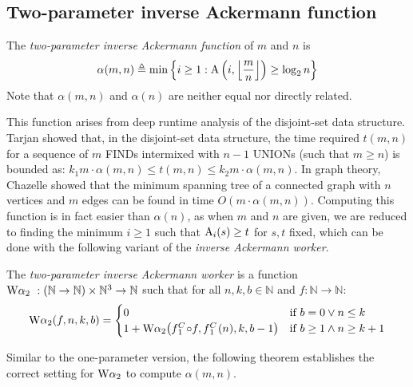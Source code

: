 \newcommand{\Texp}{\runtime_{\li{exp}}}
\newcommand{\Tmul}{\runtime_{\li{mul}}}
\newcommand{\Tleb}{\runtime_{\li{leb}}}
\newcommand{\Tsucc}{\runtime_{\li{succ}}}
\subsection{Two-parameter inverse Ackermann function}
\begin{defn} \label{defn: 2para-alpha}
	The \emph{two-parameter inverse Ackermann function} of $m$ and $n$ is
	\begin{equation} \label{eq: tmp-2para-alpha}
	\alpha(m, n) \triangleq \min\left\{i \ge 1 : \text{A}\left(i, \left\lfloor \frac{m}{n} \right\rfloor \right)\ge \log_2n \right\}
	\end{equation}
	Note that $\alpha(m, n)$ and $\alpha(n)$ are neither equal nor directly related.
\end{defn}
This function arises from deep runtime analysis of the disjoint-set data structure. Tarjan \cite{tarjan} showed that, in the disjoint-set data structure, the time required $t(m,n)$ for a sequence of $m$ \textsc{\color{magenta}FIND}s intermixed with $n-1$ \textsc{\color{magenta}UNION}s (such that $m \geq n$) is bounded as: $k_{1}m\cdot\alpha(m,n) \leq t(m,n) \leq k_{2}m\cdot\alpha(m,n)$. In graph theory, Chazelle \cite{chazelle} showed that the minimum spanning tree of a connected graph with $n$ vertices and $m$ edges can be found in time $O(m\cdot\alpha(m,n))$. Computing this function is in fact easier than $\alpha(n)$, as when $m$ and $n$ are given, we are reduced to finding the minimum $i\ge 1$ such that $\text{A}_i(s)\ge t$ for $s, t$ fixed, which can be done with the following variant of the \emph{inverse Ackermann worker}.
\begin{defn} \label{defn: 2para-inv-ack-worker}
	The \emph{two-parameter inverse Ackermann worker}  is a function $\text{W}\alpha_2\ : (\mathbb{N}\to \mathbb{N}) \times \mathbb{N}^3\to \mathbb{N}$ such that for all $n, k, b\in \mathbb{N}$ and $f:\mathbb{N}\to \mathbb{N}$:
	\begin{equation} \label{eq: 2para-inv-ack-worker-recursion}
	\W\alpha_2(f, n, k, b) = \begin{cases}
	0 & \text{if } b = 0 \vee n\le k \\ 1 + \W\alpha_2\big(\cdt{f}{1}\circ f , \cdt{f}{1}(n), k, b-1\big) & \text{if } b \ge 1 \wedge n \ge k+1
	\end{cases}
	\end{equation}
\end{defn}
Similar to the one-parameter version, the following theorem establishes the correct setting for $\text{W}\alpha_2$ to compute $\alpha(m, n)$.
